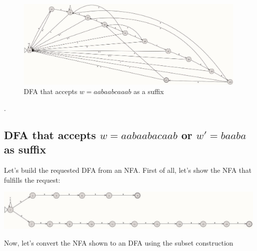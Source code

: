 \documentclass[12pt]{article}
\begin{document}
\begin{figure}[h]
    \centering
    \includegraphics[width=1\linewidth]{Tarea 2 NFA 3.b.jpg}
    \caption{DFA that accepts $w = aabaabcaaab$ as a suffix}
    \label{DFA 1}
\end{figure}.

\subsection{DFA that accepts $w = aabaabacaab$ or $w' = baaba$ as suffix}

Let's build the requested DFA from an NFA. First of all, let's show the NFA that fulfills the request:

\begin{minipage}{\textwidth}
    \centering
    \includegraphics[width=1\textwidth]{Tarea 2 NFA 3.c.jpg}
    \label{NFA 2}
\end{minipage}

Now, let's convert the NFA shown to an DFA using the subset construction
\end{document}
